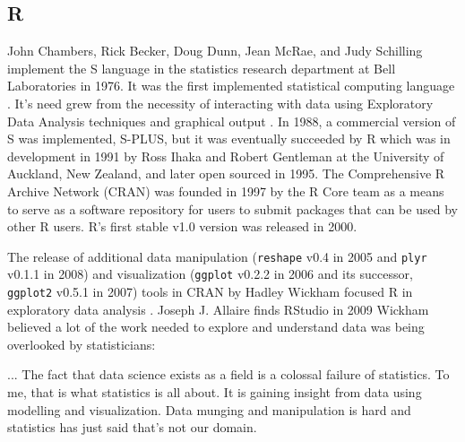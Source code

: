 \documentclass[010-intro.tex]{subfiles}
\begin{document}
    \subsection{R}

        John Chambers, Rick Becker, Doug Dunn, Jean McRae, and Judy Schilling
        implement the S language in the statistics research department at Bell Laboratories in 1976.
        It was the first implemented statistical computing language
        \cite{beckerBriefHistory1994}.
        It's need grew from the necessity of interacting with data using Exploratory Data Analysis
        techniques and graphical output
        \cite{beckerBriefHistory1994}.
        In 1988, a commercial version of S was implemented, S-PLUS, but it was eventually
        succeeded by R which was in development in 1991 by
        Ross Ihaka and Robert Gentleman at the University of Auckland, New Zealand,
        and later open sourced in 1995.
        The Comprehensive R Archive Network (CRAN) was founded in 1997 by the R Core team
        as a means to serve as a software repository for users to submit packages that can be
        used by other R users.
        R's first stable v1.0 version was released in 2000.

        The release of additional
        data manipulation
        (\lstinline{reshape} v0.4 in 2005 and \lstinline{plyr} v0.1.1 in 2008)
        and visualization
        (\lstinline{ggplot} v0.2.2 in 2006 and its successor, \lstinline{ggplot2} v0.5.1 in 2007)
        tools in CRAN by Hadley Wickham
        focused R in exploratory data analysis
        \cite{wickhamPracticalToolsExploring2008, tukeyExploratoryDataAnalysis1977}.
        Joseph J. Allaire finds RStudio in 2009 %
        Wickham believed a lot of the work needed to explore and understand data was being overlooked by statisticians:

        \begin{displayquote}
            ... The fact that data science exists as a field is a colossal failure of statistics.
            To me, that is what statistics is all about.
            It is gaining insight from data using modelling and visualization.
            Data munging and manipulation is hard and statistics has just said that’s not our domain.
        \end{displayquote}
\end{document}
